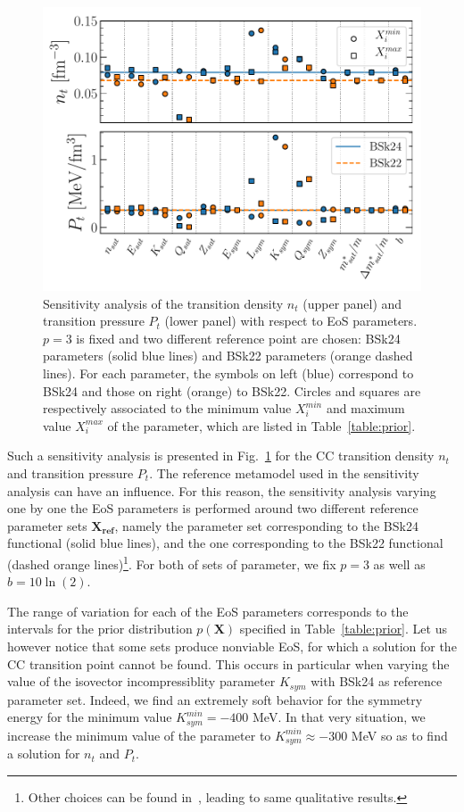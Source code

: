 \begin{figure}[!t]
\begin{center}
  \includegraphics[width=0.9\linewidth]{figures/sensana.pdf}
\end{center}
\caption[Sensitivity analysis of the crust-core transition point for
BSk24 and BSk22]{Sensitivity analysis of the transition density $n_t$ (upper 
panel) and transition pressure $P_t$ (lower panel) with respect to EoS 
parameters. $p=3$ is fixed and two different reference point are chosen:
BSk24 parameters (solid blue lines) and BSk22 parameters (orange 
dashed lines). For each parameter, the symbols on left (blue) correspond to 
BSk24 and those on right (orange) to BSk22. Circles and squares are
respectively associated to the minimum value $X_i^{min}$ and maximum value
$X_i^{max}$ of the parameter, which are listed in 
Table~\ref{table:prior}.}\label{fig:sensana}
\end{figure}
 
Such a sensitivity analysis is presented in Fig.~\ref{fig:sensana} for the 
CC transition density $n_t$ and transition pressure $P_t$. The reference 
metamodel used in the sensitivity analysis can have an influence. For this 
reason, the sensitivity analysis varying one by one the EoS parameters is 
performed around two different reference parameter sets $\bm{X_{ref}}$, namely 
the parameter set corresponding to the BSk24 functional (solid blue lines), and 
the one corresponding to the BSk22 functional 
(dashed orange lines)\footnote{Other choices can be found 
  in~\cite{Carreau2019cc}, leading to same qualitative results.}.
For both of sets of parameter, we fix $p=3$ as well as $b=10\ln(2)$.

The range of variation for each of the EoS parameters corresponds to the 
intervals for the prior distribution $p(\bm{X})$ specified in 
Table~\ref{table:prior}. Let us however notice that some sets produce nonviable 
EoS, for which a solution for the CC transition point cannot be found. This
occurs in particular when varying the value of the isovector incompressiblity 
parameter $K_{sym}$ with BSk24 as reference parameter set. Indeed, we find 
an extremely soft behavior for the symmetry energy for the minimum value 
$K_{sym}^{min}=-400$ MeV. In that very situation, we increase the minimum value 
of the parameter to $K_{sym}^{min} \approx -300$ MeV so as to find a solution 
for $n_t$ and $P_t$.

